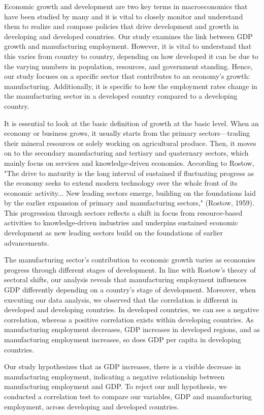 \documentclass[12pt]{article}
\begin{document}
Economic growth and development are two key terms in macroeconomics that have been studied by many and it is vital to closely monitor and understand them to realize and compose policies that drive development and growth in developing and developed countries. Our study examines the link between GDP growth and manufacturing employment. However, it is vital to understand that this varies from country to country, depending on how developed it can be due to the varying numbers in population, resources, and government standing. Hence, our study focuses on a specific sector that contributes to an economy's growth: manufacturing. Additionally, it is specific to how the employment rates change in the manufacturing sector in a developed country compared to a developing country. 

It is essential to look at the basic definition of growth at the basic level. When an economy or business grows, it usually starts from the primary sectors—trading their mineral resources or solely working on agricultural produce. Then, it moves on to the secondary manufacturing and tertiary and quaternary sectors, which mainly focus on services and knowledge-driven economies. According to Rostow, "The drive to maturity is the long interval of sustained if fluctuating progress as the economy seeks to extend modern technology over the whole front of its economic activity... New leading sectors emerge, building on the foundations laid by the earlier expansion of primary and manufacturing sectors," (Rostow, 1959). This progression through sectors reflects a shift in focus from resource-based activities to knowledge-driven industries and underpins sustained economic development as new leading sectors build on the foundations of earlier advancements.

The manufacturing sector's contribution to economic growth varies as economies progress through different stages of development. In line with Rostow's theory of sectoral shifts, our analysis reveals that manufacturing employment influences GDP differently depending on a country's stage of development. Moreover, when executing our data analysis, we observed that the correlation is different in developed and developing countries. In developed countries, we can see a negative correlation, whereas a positive correlation exists within developing countries. As manufacturing employment decreases, GDP increases in developed regions, and as manufacturing employment increases, so does GDP per capita in developing countries.

Our study hypothesizes that as GDP increases, there is a visible decrease in manufacturing employment, indicating a negative relationship between manufacturing employment and GDP. To reject our null hypothesis, we conducted a correlation test to compare our variables, GDP and manufacturing employment, across developing and developed countries. 
\end{document}
